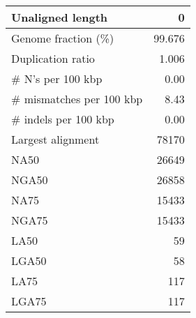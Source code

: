\documentclass[12pt,a4paper]{article}
\begin{document}
\begin{table}[ht]
\begin{center}
\begin{tabular}{|l*{1}{|r}|}
Unaligned length & 0 \\ \hline
Genome fraction (\%) & 99.676 \\ \hline
Duplication ratio & 1.006 \\ \hline
\# N's per 100 kbp & 0.00 \\ \hline
\# mismatches per 100 kbp & 8.43 \\ \hline
\# indels per 100 kbp & 0.00 \\ \hline
Largest alignment & 78170 \\ \hline
NA50 & 26649 \\ \hline
NGA50 & 26858 \\ \hline
NA75 & 15433 \\ \hline
NGA75 & 15433 \\ \hline
LA50 & 59 \\ \hline
LGA50 & 58 \\ \hline
LA75 & 117 \\ \hline
LGA75 & 117 \\ \hline
\end{tabular}
\end{center}
\end{table}
\end{document}
